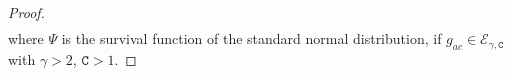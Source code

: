 \documentclass[numbers,webpdf,imaiai]{ima-authoring-template}%
\theoremstyle{thmstyletwo}%
\newcommand{\p}{\mathtt{p}}
\newcommand{\w}{\omega}
\numberwithin{equation}{section}
\begin{document}
\begin{proof}
\begin{align*}
\end{align*}
where \(\Psi\) is the survival function of the standard normal distribution, if \(g_{ac} \in \mathcal{E}_{\gamma,\mathtt C}\) with \(\gamma>2\), \(\mathtt{C}>1.\)
%
%
%
%
%
%

\end{proof}
\end{document}
